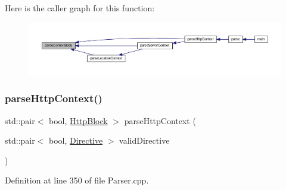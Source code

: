 Here is the caller graph for this function\+:
\nopagebreak
\begin{figure}[H]
\begin{center}
\leavevmode
\includegraphics[width=350pt]{classft_1_1_parser_aa8d68b83134b46e4b9115d9acd0cbf57_icgraph}
\end{center}
\end{figure}
\mbox{\label{classft_1_1_parser_a17a213759b2cca8e91ca225b2e86739d}} 
\subsubsection{\texorpdfstring{parse\+Http\+Context()}{parseHttpContext()}}
{\footnotesize\ttfamily std\+::pair$<$ bool, \hyperlink{classft_1_1_http_block}{Http\+Block} $>$ parse\+Http\+Context (\begin{DoxyParamCaption}\item[{std\+::pair$<$ bool, \hyperlink{classft_1_1_directive}{Directive} $>$}]{valid\+Directive }\end{DoxyParamCaption})}



Definition at line 350 of file Parser.\+cpp.


